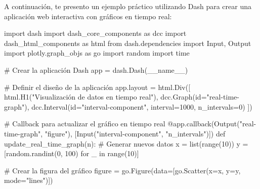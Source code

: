 \documentclass[
  a4paper,
]{article}
\newenvironment{Shaded}{}{}
\newcommand{\AttributeTok}[1]{\textcolor[rgb]{0.84,0.23,0.29}{#1}}
\newcommand{\BuiltInTok}[1]{\textcolor[rgb]{0.84,0.23,0.29}{#1}}
\newcommand{\CommentTok}[1]{\textcolor[rgb]{0.42,0.45,0.49}{#1}}
\newcommand{\ControlFlowTok}[1]{\textcolor[rgb]{0.84,0.23,0.29}{#1}}
\newcommand{\DecValTok}[1]{\textcolor[rgb]{0.00,0.36,0.77}{#1}}
\newcommand{\ImportTok}[1]{\textcolor[rgb]{0.01,0.18,0.38}{#1}}
\newcommand{\KeywordTok}[1]{\textcolor[rgb]{0.84,0.23,0.29}{#1}}
\newcommand{\NormalTok}[1]{\textcolor[rgb]{0.14,0.16,0.18}{#1}}
\newcommand{\OperatorTok}[1]{\textcolor[rgb]{0.14,0.16,0.18}{#1}}
\newcommand{\StringTok}[1]{\textcolor[rgb]{0.01,0.18,0.38}{#1}}
\newcommand{\VariableTok}[1]{\textcolor[rgb]{0.89,0.38,0.04}{#1}}
\begin{document}
A continuación, te presento un ejemplo práctico utilizando Dash para
crear una aplicación web interactiva con gráficos en tiempo real:

\begin{Shaded}
\begin{Highlighting}[]
\ImportTok{import}\NormalTok{ dash}
\ImportTok{import}\NormalTok{ dash\_core\_components }\ImportTok{as}\NormalTok{ dcc}
\ImportTok{import}\NormalTok{ dash\_html\_components }\ImportTok{as}\NormalTok{ html}
\ImportTok{from}\NormalTok{ dash.dependencies }\ImportTok{import}\NormalTok{ Input, Output}
\ImportTok{import}\NormalTok{ plotly.graph\_objs }\ImportTok{as}\NormalTok{ go}
\ImportTok{import}\NormalTok{ random}
\ImportTok{import}\NormalTok{ time}

\CommentTok{\# Crear la aplicación Dash}
\NormalTok{app }\OperatorTok{=}\NormalTok{ dash.Dash(}\VariableTok{\_\_name\_\_}\NormalTok{)}

\CommentTok{\# Definir el diseño de la aplicación}
\NormalTok{app.layout }\OperatorTok{=}\NormalTok{ html.Div([}
\NormalTok{    html.H1(}\StringTok{"Visualización de datos en tiempo real"}\NormalTok{),}
\NormalTok{    dcc.Graph(}\BuiltInTok{id}\OperatorTok{=}\StringTok{"real{-}time{-}graph"}\NormalTok{),}
\NormalTok{    dcc.Interval(}\BuiltInTok{id}\OperatorTok{=}\StringTok{"interval{-}component"}\NormalTok{, interval}\OperatorTok{=}\DecValTok{1000}\NormalTok{, n\_intervals}\OperatorTok{=}\DecValTok{0}\NormalTok{)}
\NormalTok{])}

\CommentTok{\# Callback para actualizar el gráfico en tiempo real}
\AttributeTok{@app.callback}\NormalTok{(Output(}\StringTok{"real{-}time{-}graph"}\NormalTok{, }\StringTok{"figure"}\NormalTok{),}
\NormalTok{              [Input(}\StringTok{"interval{-}component"}\NormalTok{, }\StringTok{"n\_intervals"}\NormalTok{)])}
\KeywordTok{def}\NormalTok{ update\_real\_time\_graph(n):}
    \CommentTok{\# Generar nuevos datos}
\NormalTok{    x }\OperatorTok{=} \BuiltInTok{list}\NormalTok{(}\BuiltInTok{range}\NormalTok{(}\DecValTok{10}\NormalTok{))}
\NormalTok{    y }\OperatorTok{=}\NormalTok{ [random.randint(}\DecValTok{0}\NormalTok{, }\DecValTok{100}\NormalTok{) }\ControlFlowTok{for}\NormalTok{ \_ }\KeywordTok{in} \BuiltInTok{range}\NormalTok{(}\DecValTok{10}\NormalTok{)]}

    \CommentTok{\# Crear la figura del gráfico}
\NormalTok{    figure }\OperatorTok{=}\NormalTok{ go.Figure(data}\OperatorTok{=}\NormalTok{[go.Scatter(x}\OperatorTok{=}\NormalTok{x, y}\OperatorTok{=}\NormalTok{y, mode}\OperatorTok{=}\StringTok{"lines"}\NormalTok{)])}


\end{Highlighting}
\end{Shaded}
\end{document}
